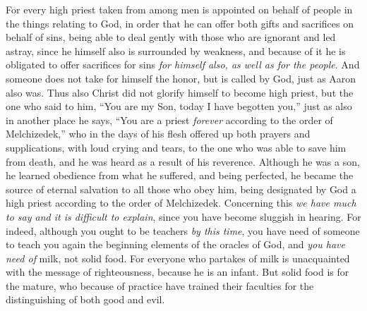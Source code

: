 \begin{biblechapter} %
 For every high priest taken from among men is appointed on behalf of people in the things relating to God, in order that he can offer both gifts and sacrifices on behalf of sins,
\verse being able to deal gently with those who are ignorant and led astray, since he himself also is surrounded by weakness,
\verse and because of it he is obligated to offer sacrifices for sins \textit{for himself also, as well as for the people}.
\verse And someone does not take for himself the honor, but is called by God, just as Aaron also was.
\verse Thus also Christ did not glorify himself to become high priest, but the one who said to him, “You are my Son, today I have begotten you,”
\verse just as also in another place he says, “You are a priest \textit{forever} according to the order of Melchizedek,”
\verse who in the days of his flesh offered up both prayers and supplications, with loud crying and tears, to the one who was able to save him from death, and he was heard as a result of his reverence.
\verse Although he was a son, he learned obedience from what he suffered,
\verse and being perfected, he became the source of eternal salvation to all those who obey him,
\verse being designated by God a high priest according to the order of Melchizedek.
 Concerning this \textit{we have much to say and it is difficult to explain}, since you have become sluggish in hearing.
\verse For indeed, although you ought to be teachers \textit{by this time}, you have need of someone to teach you again the beginning elements of the oracles of God, and \textit{you have need of} milk, not solid food.
\verse For everyone who partakes of milk is unacquainted with the message of righteousness, because he is an infant.
\verse But solid food is for the mature, who because of practice have trained their faculties for the distinguishing of both good and evil.
\end{biblechapter}

